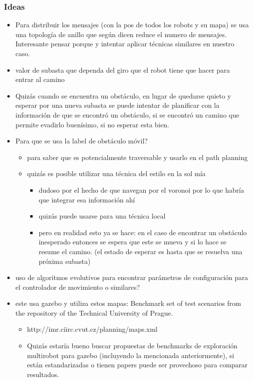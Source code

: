 \subsubsection{Ideas}
\begin{itemize}
\item Para distribuir los mensajes (con la pos de todos los robots y su mapa) se usa una topología de anillo que según dicen reduce el numero de mensajes. Interesante pensar porque y intentar aplicar técnicas similares en nuestro caso.

\item valor de subasta que dependa del giro que el robot tiene que hacer para entrar al camino

\item Quizás cuando se encuentra un obstáculo, en lugar de quedarse quieto y esperar por una nueva subasta se puede intentar de planificar con la información de que se encontró un obstáculo, si se encontró un camino que permite evadirlo buenísimo, si no esperar esta bien.

\item Para que se usa la label de obstáculo móvil?
\begin{itemize}
  \item para saber que es potencialmente traversable y usarlo en el path planning
  \item quizás es posible utilizar una técnica del estilo en la sol mía
  \begin{itemize}
    \item dudoso por el hecho de que navegan por el voronoi por lo que habría que integrar esa información ahí
    \item quizás puede usarse para una técnica local 
    \item pero en realidad esto ya se hace: en el caso de encontrar un obstáculo inesperado entonces se espera que este se mueva y si lo hace se resume el camino. (el estado de esperar es hasta que se resuelva una próxima subasta)
  \end{itemize}
\end{itemize}

\item uso de algoritmos evolutivos para encontrar parámetros de configuración para el controlador de movimiento o similares?

\item este usa gazebo y utiliza estos mapas: Benchmark set of test scenarios from the repository of the Technical University of Prague.
\begin{itemize}
  \item http://imr.ciirc.cvut.cz/planning/maps.xml
  \item Quizás estaría bueno buscar propuestas de benchmarks de exploración multirobot para gazebo (incluyendo la mencionada anteriormente), si están estandarizadas o tienen papers puede ser provechoso para comparar resultados.
\end{itemize}


\end{itemize}
